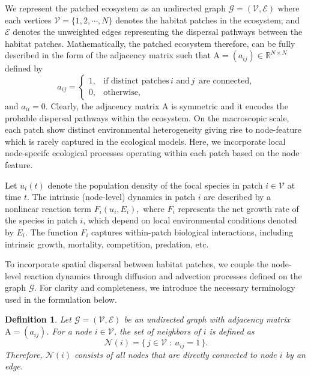 \documentclass[12pt]{article}
\newtheorem{definition}{Definition}[section]
\begin{document}
We represent the patched ecosystem as an undirected graph $\mathcal{G} = (\mathcal{V}, \mathcal{E})$ where each vertices $\mathcal{V}=\{1,2,\cdots,N\}$ denotes the habitat patches in the ecosystem; and $\mathcal{E}$ denotes the unweighted edges representing the dispersal pathways between the habitat patches. Mathematically, the patched ecosystem therefore, can be fully described in the form of the adjacency matrix such that 
$\mathrm{A} = (a_{ij}) \in \mathbb{R}^{N \times N}$ defined by
\begin{equation}
        a_{ij} =
\begin{cases}
1, & \text{if distinct patches}\, i \text{ and}\, j\,\text{ are connected,} \\
0, & \text{otherwise},
\end{cases}
\end{equation}
and $a_{ii}=0.$ Clearly, the adjacency matrix $\mathrm{A}$ is symmetric and it encodes the probable dispersal pathways within the ecosystem. On the macroscopic scale, each patch show distinct environmental heterogeneity giving rise to node-feature which is rarely captured in the ecological models. Here, we incorporate local node-specifc ecological processes operating within each patch based on the node feature.

Let $u_i(t)$ denote the population density of the focal species in patch 
$i \in \mathcal{V}$ at time $t$. The intrinsic (node-level) dynamics in 
patch $i$ are described by a nonlinear reaction term 
$F_i(u_i, E_i),$ where $F_i$ represents the net growth rate of the species in patch $i$, which depend on local environmental conditions denoted by $E_i.$ The function $F_i$ captures within-patch biological interactions, 
including intrinsic growth, mortality, competition, predation, etc. 


To incorporate spatial dispersal between habitat patches, we couple the 
node-level reaction dynamics through diffusion and advection processes 
defined on the graph $\mathcal{G}$. For clarity and completeness, 
we introduce the necessary terminology used in the formulation below.

\begin{definition}
Let $\mathcal{G} = (\mathcal{V}, \mathcal{E})$ be an undirected graph 
with adjacency matrix $\mathrm{A} = (a_{ij})$. 
For a node $i \in \mathcal{V}$, the set of \emph{neighbors} of $i$ 
is defined as
\[
\mathcal{N}(i) = \{\, j \in \mathcal{V} \; : \; a_{ij} = 1 \,\}.
\]
Therefore, $\mathcal{N}(i)$ consists of all nodes that are directly 
connected to node $i$ by an edge.
\end{definition}
\end{document}

